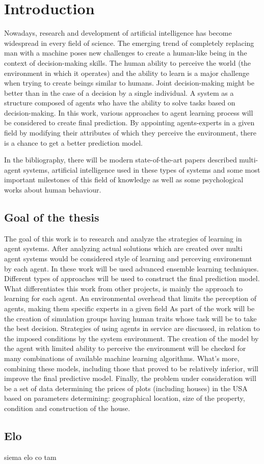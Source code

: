 \chapter{Introduction}


\quad Nowadays, research and development of artificial intelligence has become widespread in every field of science. The emerging trend of completely replacing man with a machine poses new challenges to create a human-like being in the context of decision-making skills. The human ability to perceive the world (the environment in which it operates) and the ability to learn is a major challenge when trying to create beings similar to humans. 
Joint decision-making might be better than in the case of a decision by a single individual. A system as a structure composed of agents who have the ability to solve tasks based on decision-making. In this work, various approaches to agent learning process will be considered to create final prediction. By appointing agents-experts in a given field by modifying their attributes of which they perceive the environment, there is a chance to get a better prediction model.

In the bibliography, there will be modern state-of-the-art papers described multi-agent systems, artificial intelligence used in these types of systems and some most important milestones of this field of knowledge as well as some psychological works about human behaviour.

\section{Goal of the thesis}


\quad The goal of this work is to research and analyze the strategies of learning in agent systems. After analyzing actual solutions which are created over multi agent systems would be considered style of learning and perceving environemnt by each agent.
In these work will be used advanced ensemble learning techniques. Different types of approaches will be used to construct the final prediction model. What differentiates this work from other projects, is mainly the approach to learning for each agent. An environmental overhead that limits the perception of agents, making them specific experts in a given field
As part of the work will be the creation of simulation groups having human traits whose task will be to take the best decision. Strategies of using agents in service are discussed, in relation to the imposed conditions by the system environment. The creation of the model by the agent with limited ability to perceive the environment will be checked for many combinations of available machine learning algorithms. What's more, combining these models, including those that proved to be relatively inferior, will improve the final predictive model.
Finally, the problem under consideration will be a set of data determining the prices of plots (including houses) in the USA based on parameters determining: geographical location, size of the property, condition and construction of the house.

\section{Elo}

\quad siema elo
co tam
